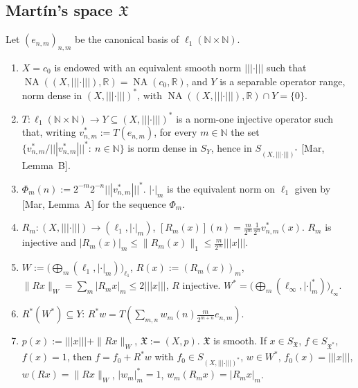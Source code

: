 \documentclass[10pt]{amsart}
\theoremstyle{remark}
\newcommand{\N}{\mathbb{N}}
\newcommand{\R}{\mathbb{R}}
\newcommand{\X}{\mathfrak{X}}
\newcommand{\NA}{\operatorname{NA}}
\newcommand{\tn}[1]{|\!|\!|#1|\!|\!|}
\begin{document}
\subsection{Mart\'in's space $\X$}\label{subsec:space}
Let $(e_{n,m})_{n,m}$ be the canonical basis of $\ell_1(\N\times\N)$.
\begin{enumerate}
\item[(M1)] $X=c_0$ is endowed with an equivalent smooth norm $\tn{\cdot}$ such that $\NA((X,\tn{\cdot}),\R)=\NA(c_0,\R)$, and $Y$ is a separable operator range, norm dense in $(X,\tn{\cdot})^*$, with $\NA((X,\tn{\cdot}),\R)\cap Y=\{0\}$.
\item[(M2)] $T:\ell_1(\N\times\N)\to Y\subseteq (X,\tn{\cdot})^*$ is a norm-one injective operator such that, writing $v^*_{n,m}:=T(e_{n,m})$, for every $m\in\N$ the set $\{v^*_{n,m}/\tn{v^*_{n,m}}^*:\ n\in\N\}$ is norm dense in $S_Y$, hence in $S_{(X,\tn{\cdot})^*}$ [Mar, Lemma~B].
\item[(M3)] $\Phi_m(n):=2^{-m}2^{-n}\tn{v^*_{n,m}}^*$. $|\cdot|_m$ is the equivalent norm on $\ell_1$ given by [Mar, Lemma~A] for the sequence $\Phi_m$.
\item[(M4)] $R_m:(X,\tn{\cdot})\to(\ell_1,|\cdot|_m)$, $[R_m(x)](n)=\frac{m}{2^m}\frac{1}{2^n}v^*_{n,m}(x)$. $R_m$ is injective and $|R_m(x)|_m\le\|R_m(x)\|_1\le \frac{m}{2^m}\tn{x}$.
\item[(M5)] $W:=\big(\bigoplus_{m}(\ell_1,|\cdot|_m)\big)_{\ell_1}$, $R(x):=(R_m(x))_{m}$, $\|Rx\|_W=\sum_m|R_m x|_m\le 2\tn{x}$, $R$ injective. $W^*=\big(\bigoplus_{m}(\ell_\infty,|\cdot|_m^*)\big)_{\ell_\infty}$.
\item[(M6)] $R^*(W^*)\subseteq Y$: $R^*w=T\left(\sum_{m,n}w_m(n)\frac{m}{2^{m+n}}e_{n,m}\right)$.
\item[(M7)] $p(x):=\tn{x}+\|Rx\|_W$, $\X:=(X,p)$. $\X$ is smooth. If $x\in S_\X$, $f\in S_{\X^*}$, $f(x)=1$, then $f=f_0+R^*w$ with $f_0\in S_{(X,\tn{\cdot})^*}$, $w\in W^*$, $f_0(x)=\tn{x}$, $w(Rx)=\|Rx\|_W$, $|w_m|_m^*=1$, $w_m(R_mx)=|R_mx|_m$.
\end{enumerate}
\end{document}
